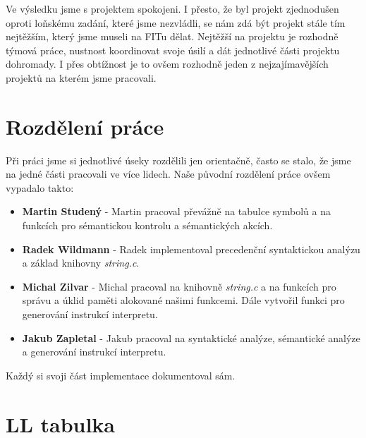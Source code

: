 \documentclass[11pt, a4paper]{article}
\begin{document}
Ve výsledku jsme s projektem spokojeni. I přesto, že byl projekt zjednodušen oproti loňskému zadání, které jsme nezvládli, se nám zdá být projekt stále tím nejtěžším, který jsme museli na FITu dělat. Nejtěžší na projektu je rozhodně týmová práce, nustnost koordinovat svoje úsilí a dát jednotlivé části projektu dohromady. I přes obtížnost je to ovšem rozhodně jeden z nejzajímavějších projektů na kterém jsme pracovali. 

\newpage

\section{Rozdělení práce}

Při práci jsme si jednotlivé úseky rozdělili jen orientačně, často se stalo, že jsme na jedné části pracovali ve více lidech. Naše původní rozdělení práce ovšem vypadalo takto:

\begin{itemize}  
\item \textbf{Martin Studený} - Martin pracoval převážně na tabulce symbolů a na funkcích pro sémantickou kontrolu a sémantických akcích.
\item \textbf{Radek Wildmann} - Radek implementoval precedenční syntaktickou analýzu a základ knihovny \textit{string.c}. 
\item \textbf{Michal Zilvar} - Michal pracoval na knihovně \textit{string.c} a na funkcích pro správu a úklid paměti alokované našimi funkcemi. Dále vytvořil funkci pro generování instrukcí interpretu. 
\item \textbf{Jakub Zapletal} - Jakub pracoval na syntaktické analýze, sémantické analýze a generování instrukcí interpretu.
\end{itemize}

Každý si svoji část implementace dokumentoval sám.

\newpage

\section{LL tabulka}
\end{document}
